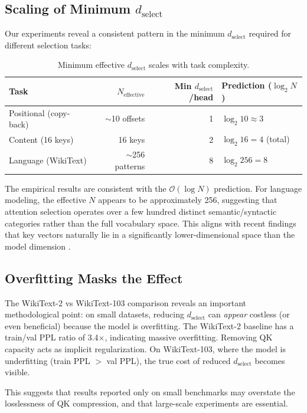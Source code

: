 \documentclass{article} %
\newcommand{\dselect}{d_{\text{select}}}
\newcommand{\BigO}{\mathcal{O}}
\begin{document}
\subsection{Scaling of Minimum $\dselect$}

Our experiments reveal a consistent pattern in the minimum $\dselect$ required for different selection tasks:

\begin{table}[h]
\centering
\caption{Minimum effective $\dselect$ scales with task complexity.}
\label{tab:scaling}
\begin{tabular}{lrrl}
\toprule
Task & $N_{\text{effective}}$ & Min $\dselect$/head & Prediction ($\log_2 N$) \\
\midrule
Positional (copy-back) & $\sim$10 offsets & 1 & $\log_2 10 \approx 3$ \\
Content (16 keys)      & 16 keys         & 2 & $\log_2 16 = 4$ (total) \\
Language (WikiText)     & $\sim$256 patterns & 8 & $\log_2 256 = 8$ \\
\bottomrule
\end{tabular}
\end{table}

The empirical results are consistent with the $\BigO(\log N)$ prediction. For language modeling, the effective $N$ appears to be approximately 256, suggesting that attention selection operates over a few hundred distinct semantic/syntactic categories rather than the full vocabulary space. This aligns with recent findings that key vectors naturally lie in a significantly lower-dimensional space than the model dimension \citep{loki2024}.


\subsection{Overfitting Masks the Effect}

The WikiText-2 vs WikiText-103 comparison reveals an important methodological point: on small datasets, reducing $\dselect$ can \emph{appear} costless (or even beneficial) because the model is overfitting. The WikiText-2 baseline has a train/val PPL ratio of 3.4$\times$, indicating massive overfitting. Removing QK capacity acts as implicit regularization. On WikiText-103, where the model is underfitting (train PPL $>$ val PPL), the true cost of reduced $\dselect$ becomes visible.

This suggests that results reported only on small benchmarks may overstate the losslessness of QK compression, and that large-scale experiments are essential.
\end{document}
